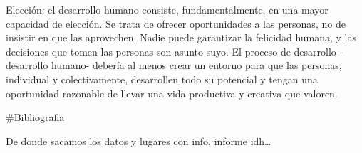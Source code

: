 \documentclass[
  10pt,
]{article}
\begin{document}
Elección: el desarrollo humano consiste, fundamentalmente, en una mayor
capacidad de elección. Se trata de ofrecer oportunidades a las personas,
no de insistir en que las aprovechen. Nadie puede garantizar la
felicidad humana, y las decisiones que tomen las personas son asunto
suyo. El proceso de desarrollo -desarrollo humano- debería al menos
crear un entorno para que las personas, individual y colectivamente,
desarrollen todo su potencial y tengan una oportunidad razonable de
llevar una vida productiva y creativa que valoren.

\#Bibliografia

De donde sacamos los datos y lugares con info, informe idh\ldots{}
\end{document}
